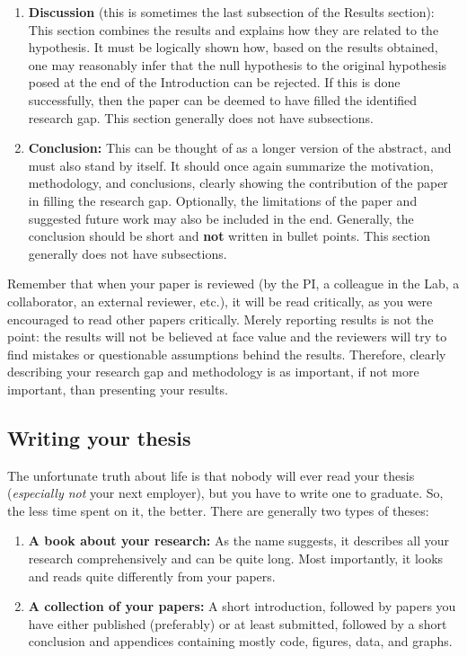 \documentclass[12pt]{article}
\begin{document}
\begin{enumerate}
	\item \textbf{Discussion} (this is sometimes the last subsection of the Results section): This section combines the results and explains how they are related to the hypothesis. It must be logically shown how, based on the results obtained, one may reasonably infer that the null hypothesis to the original hypothesis posed at the end of the Introduction can be rejected. If this is done successfully, then the paper can be deemed to have filled the identified research gap. This section generally does not have subsections.
	\item \textbf{Conclusion:} This can be thought of as a longer version of the abstract, and must also stand by itself. It should once again summarize the motivation, methodology, and conclusions, clearly showing the contribution of the paper in filling the research gap. Optionally, the limitations of the paper and suggested future work may also be included in the end. Generally, the conclusion should be short and \textbf{not} written in bullet points. This section generally does not have subsections.
\end{enumerate}

Remember that when your paper is reviewed (by the PI, a colleague in the Lab, a collaborator, an external reviewer, etc.), it will be read critically, as you were encouraged to read other papers critically. Merely reporting results is not the point: the results will not be believed at face value and the reviewers will try to find mistakes or questionable assumptions behind the results. Therefore, clearly describing your research gap and methodology is as important, if not more important, than presenting your results. 

\subsection{Writing your thesis}
The unfortunate truth about life is that nobody will ever read your thesis (\textit{especially not} your next employer), but you have to write one to graduate. So, the less time spent on it, the better. There are generally two types of theses:

\begin{enumerate}
	\item \textbf{A book about your research:} As the name suggests, it describes all your research comprehensively and can be quite long. Most importantly, it looks and reads quite differently from your papers.
	\item \textbf{A collection of your papers:} A short introduction, followed by papers you have either published (preferably) or at least submitted, followed by a short conclusion and appendices containing mostly code, figures, data, and graphs.
\end{enumerate}
\end{document}
